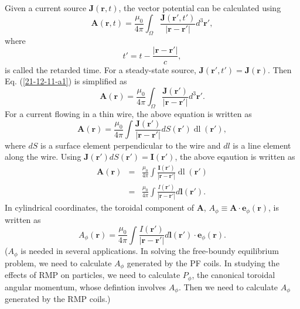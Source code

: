 \documentclass{llncs}
\newcommand{\tmop}[1]{\ensuremath{\operatorname{#1}}}
\begin{document}
Given a current source $\mathbf{J} (\mathbf{r}, t)$, the vector potential can
be calculated using
\begin{equation}
  \label{21-12-11-a1} \mathbf{A} (\mathbf{r}, t) = \frac{\mu_0}{4 \pi}
  \int_{\Omega} \frac{\mathbf{J} (\mathbf{r}', t')}{| \mathbf{r}-\mathbf{r}'
  |} d^3 \mathbf{r}',
\end{equation}
where
\begin{equation}
  t' = t - \frac{| \mathbf{r}-\mathbf{r}' |}{c},
\end{equation}
is called the retarded time. For a steady-state source, $\mathbf{J}
(\mathbf{r}', t') =\mathbf{J} (\mathbf{r})$. Then Eq. (\ref{21-12-11-a1}) is
simplified as
\begin{equation}
  \mathbf{A} (\mathbf{r}) = \frac{\mu_0}{4 \pi} \int_{\Omega} \frac{\mathbf{J}
  (\mathbf{r}')}{| \mathbf{r}-\mathbf{r}' |} d^3 \mathbf{r}' .
\end{equation}
For a current flowing in a thin wire, the above equation is written as
\begin{equation}
  \mathbf{A} (\mathbf{r}) = \frac{\mu_0}{4 \pi} \int \frac{\mathbf{J}
  (\mathbf{r}')}{| \mathbf{r}-\mathbf{r}' |} d S (\mathbf{r}') \tmop{dl}
  (\mathbf{r}'),
\end{equation}
where $d S$ is a surface element perpendicular to the wire and $d l$ is a line
element along the wire. Using $\mathbf{J} (\mathbf{r}') d S (\mathbf{r}')
=\mathbf{I} (\mathbf{r}')$, the above eqaution is written as
\begin{eqnarray}
  \mathbf{A} (\mathbf{r}) & = & \frac{\mu_0}{4 \pi} \int \frac{\mathbf{I}
  (\mathbf{r}')}{| \mathbf{r}-\mathbf{r}' |} \tmop{dl} (\mathbf{r}')
  \nonumber\\
  & = & \frac{\mu_0}{4 \pi} \int \frac{I (\mathbf{r}')}{|
  \mathbf{r}-\mathbf{r}' |} d\mathbf{l} (\mathbf{r}') . 
\end{eqnarray}
In cylindrical coordinates, the toroidal component of $\mathbf{A}$, $A_{\phi}
\equiv \mathbf{A} \cdot \mathbf{e}_{\phi} (\mathbf{r})$, is written as
\begin{equation}
  \label{24-6-14-p1} A_{\phi} (\mathbf{r}) = \frac{\mu_0}{4 \pi} \int \frac{I
  (\mathbf{r}')}{| \mathbf{r}-\mathbf{r}' |} d\mathbf{l} (\mathbf{r}') \cdot
  \mathbf{e}_{\phi} (\mathbf{r}) .
\end{equation}
($A_{\phi}$ is needed in several applications. In solving the free-boundy
equilibrium problem, we need to calculate $A_{\phi}$ generated by the PF
coils. In studying the effects of RMP on particles, we need to calculate
$P_{\phi}$, the canonical toroidal angular momentum, whose defintion involves
$A_{\phi}$. Then we need to calculate $A_{\phi}$ generated by the RMP coils.)
\end{document}
